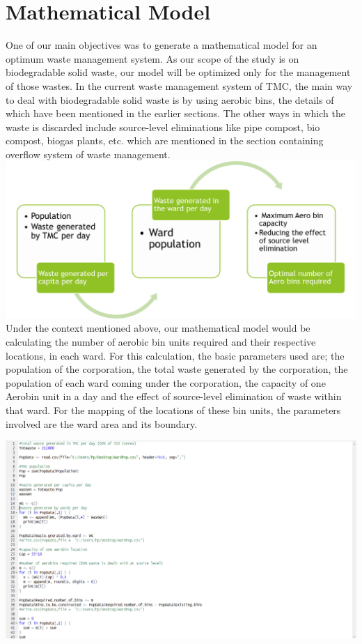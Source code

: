 \documentclass[12pt,a4paper]{report}
\begin{document}
\chapter{\textbf{Mathematical Model}}
One of our main objectives was to generate a mathematical model for an optimum waste management system. As our scope of the study is on biodegradable solid waste, our model will be optimized only for the management of those wastes. In the current waste management system of TMC, the main way to deal with biodegradable solid waste is by using aerobic bins, the details of which have been mentioned in the earlier sections. The other ways in which the waste is discarded include source-level eliminations like pipe compost, bio compost, biogas plants, etc. which are mentioned in the section containing overflow system of waste management.
\includegraphics[width=1\textwidth]{mathmod}
Under the context mentioned above, our mathematical model would be calculating the number of aerobic bin units required and their respective locations, in each ward. For this calculation, the basic parameters used are; the population of the corporation, the total waste generated by the corporation, the population of each ward coming under the corporation, the capacity of one Aerobin unit in a day and the effect of source-level elimination of waste within that ward. For the mapping of the locations of these bin units, the parameters involved are the ward area and its boundary.

\includegraphics[width=1\textwidth]{mathmodr}
\end{document}
